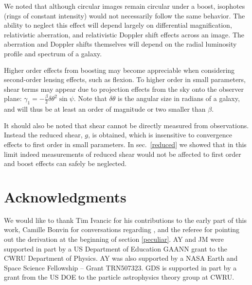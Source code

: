 \documentclass[useAMS,fleqn,usenatbib]{mn2e}
\begin{document}
We noted that although circular images remain circular under a boost, isophotes 
(rings of constant intensity) would not necessarily follow the same behavior. 
The ability to neglect this effect will depend largely on differential 
magnification, relativistic aberration, and relativistic Doppler shift effects 
across an image.  The aberration and Doppler shifts themselves will depend 
on the radial luminosity profile and spectrum of a galaxy.

Higher order effects from boosting may become appreciable when considering 
second-order lensing effects, such as flexion.  To
higher order in small parameters, shear terms may 
appear due to projection effects from the sky onto the observer plane:
$\gamma_{1}=-\frac{\beta}{2}\delta\theta^{2}\sin\psi$.
Note that $\delta\theta$ is the angular size in radians of a galaxy, and 
will thus be at least an order of magnitude or two smaller than $\beta$.

It should also be noted that shear cannot be directly measured from observations.
Instead the reduced shear, $g$, is obtained, which is
insensitive to convergence effects to first order in small parameters.
In sec.~\ref{reduced} we showed that in this limit indeed measurements
of reduced shear would not be affected to first order and boost effects can 
safely be neglected. 


\section*{Acknowledgments}
We would like to thank Tim Ivancic for his contributions to the early part of this work, Camille Bonvin for conversations regarding \cite{Bonvin:2008ni}, and the referee for pointing out the derivation at the beginning of section \ref{peculiar}.
AY and JM were supported in part by a US Department of Education GAANN grant to the CWRU Department of Physics.  AY was also supported by a NASA Earth and Space Science Fellowship -- Grant TRN507323.
GDS is supported in part by a grant from the US DOE to the particle astrophysics theory group at CWRU.  


\end{document}

